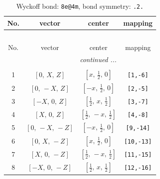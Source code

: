 \documentclass[fleqn,8pt]{jsarticle}
\begin{document}
\begin{longtable}{cccc}
\caption{Wyckoff bond: {\tt 8e@4m}, bond symmetry: {\tt .2.}}
 \\
 \hline \hline
No. & vector & center & mapping \\ \hline \endfirsthead

\multicolumn{3}{l}{\tablename\ \thetable{}} \\
 \hline \hline
No. & vector & center & mapping \\ \hline \endhead

 \hline \hline
\multicolumn{3}{r}{\footnotesize\it continued ...} \\ \endfoot

 \hline \hline
\multicolumn{3}{r}{} \\ \endlastfoot

1 & $\left[ 0,\, X,\, Z \right]$ & $\left[ x,\, \frac{1}{2},\, 0 \right]$ & {\tt [1,-6]} \\ \hline
2 & $\left[ 0,\, - X,\, Z \right]$ & $\left[ - x,\, \frac{1}{2},\, 0 \right]$ & {\tt [2,-5]} \\ \hline
3 & $\left[ - X,\, 0,\, Z \right]$ & $\left[ \frac{1}{2},\, x,\, \frac{1}{2} \right]$ & {\tt [3,-7]} \\ \hline
4 & $\left[ X,\, 0,\, Z \right]$ & $\left[ \frac{1}{2},\, - x,\, \frac{1}{2} \right]$ & {\tt [4,-8]} \\ \hline
5 & $\left[ 0,\, - X,\, - Z \right]$ & $\left[ - x,\, \frac{1}{2},\, 0 \right]$ & {\tt [9,-14]} \\ \hline
6 & $\left[ 0,\, X,\, - Z \right]$ & $\left[ x,\, \frac{1}{2},\, 0 \right]$ & {\tt [10,-13]} \\ \hline
7 & $\left[ X,\, 0,\, - Z \right]$ & $\left[ \frac{1}{2},\, - x,\, \frac{1}{2} \right]$ & {\tt [11,-15]} \\ \hline
8 & $\left[ - X,\, 0,\, - Z \right]$ & $\left[ \frac{1}{2},\, x,\, \frac{1}{2} \right]$ & {\tt [12,-16]} \\
\end{longtable}
\renewcommand{\arraystretch}{1.2}
\end{document}
